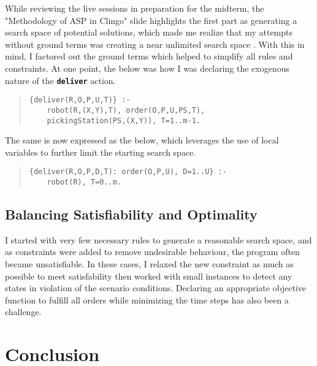 \documentclass[letterpaper]{article}
\newcommand{\ct}[1]{\texttt{\textbf{#1}}}
\begin{document}
While reviewing the live sessions in preparation for the midterm, the "Methodology of ASP in Clingo" slide highlights the first part as generating a search space of potential solutions, which made me realize that my attempts without ground terms was creating a near unlimited search space \cite{Altunkaya2023}. With this in mind, I factored out the ground terms which helped to simplify all rules and constraints. At one point, the below was how I was declaring the exogenous nature of the \ct{deliver} action.

\begin{quote}\begin{scriptsize}\begin{verbatim}
{deliver(R,O,P,U,T)} :-
    robot(R,(X,Y),T), order(O,P,U,PS,T),
    pickingStation(PS,(X,Y)), T=1..m-1.
\end{verbatim}\end{scriptsize}\end{quote}

The same is now expressed as the below, which leverages the use of local variables to further limit the starting search space.

\begin{quote}\begin{scriptsize}\begin{verbatim}
{deliver(R,O,P,D,T): order(O,P,U), D=1..U} :-
    robot(R), T=0..m.
\end{verbatim}\end{scriptsize}\end{quote}


\subsection{Balancing Satisfiability and Optimality}

I started with very few necessary rules to generate a reasonable search space, and as constraints were added to remove undesirable behaviour, the program often became unsatisfiable. In these cases, I relaxed the new constraint as much as possible to meet satisfability then worked with small instances to detect any states in violation of the scenario conditions. Declaring an appropriate objective function to fulfill all orders while minimizing the time steps has also been a challenge.

\section{Conclusion}
\end{document}
